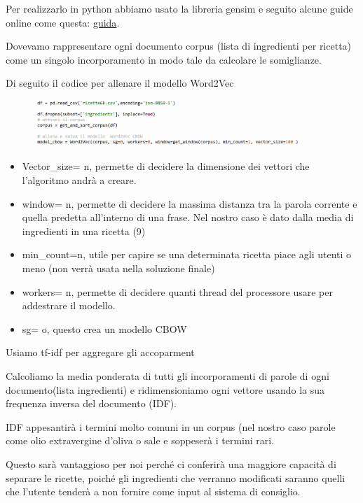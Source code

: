 \documentclass[12pt]{report}
\begin{document}
Per realizzarlo in python abbiamo usato la libreria gensim e seguito alcune guide online come questa: \href{http://nadbordrozd.github.io/blog/2016/05/20/text-classification-with-word2vec/}{guida}.

Dovevamo rappresentare ogni documento corpus (lista di ingredienti per ricetta) come un singolo incorporamento in modo tale da calcolare le somiglianze.

Di seguito il codice per allenare il modello Word2Vec

\begin{figure}[H]
        \centering
        {\includegraphics[width=0.9\textwidth]{img/img14.jpg}}
\end{figure}

\begin{itemize}
	\item Vector\_size= n, permette di decidere la dimensione dei vettori che l'algoritmo andrà a creare.
	\item window= n, permette di decidere la massima distanza tra la parola corrente e quella predetta all'interno di una frase. Nel nostro caso è dato dalla media di ingredienti in una ricetta (9)
	\item min\_count=n, utile per capire se una determinata ricetta piace agli utenti o meno (non verrà usata nella soluzione finale)
	\item workers= n, permette di decidere quanti thread del processore usare per addestrare il modello.
	\item sg= o, questo crea un modello CBOW
 \end{itemize}

Usiamo tf-idf per aggregare gli accoparment

Calcoliamo la media ponderata di tutti gli incorporamenti di parole di ogni documento(lista ingredienti) e ridimensioniamo ogni vettore usando la sua frequenza inversa del documento (IDF).

IDF appesantirà i termini molto comuni in un corpus (nel nostro caso parole come olio extravergine d'oliva o sale e soppeserà i termini rari.

Questo sarà vantaggioso per noi perché ci conferirà una maggiore capacità di separare le ricette, poiché gli ingredienti che verranno modificati saranno quelli che l'utente tenderà a non fornire come input al sistema di consiglio.
\end{document}
